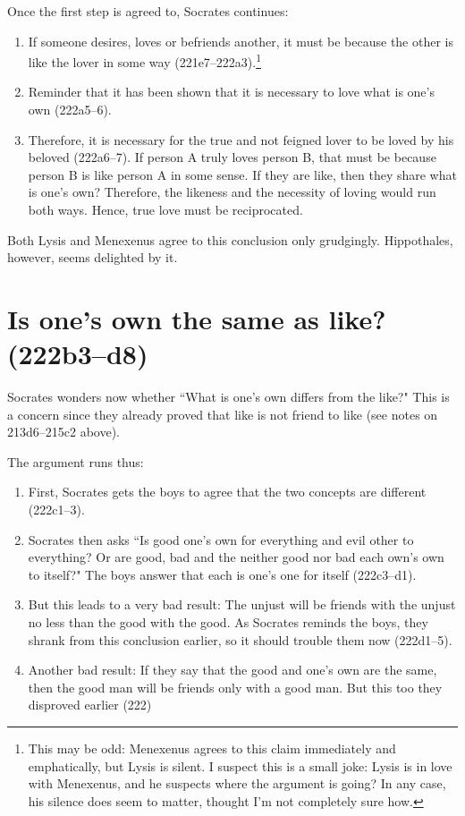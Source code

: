 \documentclass[11pt]{article}
\begin{document}
Once the first step is agreed to, Socrates continues:

\begin{enumerate}
    \item If someone desires, loves or befriends another, it must be because the other is like the lover in some way (221e7--222a3).\footnote{This may be odd: Menexenus agrees to this claim immediately and emphatically, but Lysis is silent.  I suspect this is a small joke: Lysis is in love with Menexenus, and he suspects where the argument is going?  In any case, his silence does seem to matter, thought I'm not completely sure how.}
    \item Reminder that it has been shown that it is necessary to love what is one's own (222a5--6).
    \item Therefore, it is necessary for the true and not feigned lover to be loved by his beloved (222a6--7).  If person A truly loves person B, that must be because person B is like person A in some sense.  If they are like, then they share what is one's own?  Therefore, the likeness and the necessity of loving would run both ways.  Hence, true love must be reciprocated.
\end{enumerate}

Both Lysis and Menexenus agree to this conclusion only grudgingly.  Hippothales, however, seems delighted by it.


\section{Is one's own the same as like? (222b3--d8)}

Socrates wonders now whether ``What is one's own differs from the like?"  This is a concern since they already proved that like is not friend to like (see notes on 213d6--215c2 above).

The argument runs thus:

\begin{enumerate}
    \item First, Socrates gets the boys to agree that the two concepts are different (222c1--3).
    \item Socrates then asks ``Is good one's own for everything and evil other to everything? Or are good, bad and the neither good nor bad each own's own to itself?"  The boys answer that each is one's one for itself (222c3--d1).
    \item But this leads to a very bad result: The unjust will be friends with the unjust no less than the good with the good.  As Socrates reminds the boys, they shrank from this conclusion earlier, so it should trouble them now (222d1--5).
    \item Another bad result: If they say that the good and one's own are the same, then the good man will be friends only with a good man.  But this too they disproved earlier (222)
\end{enumerate}
\end{document}
